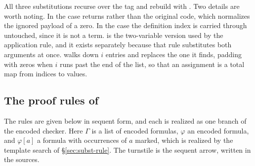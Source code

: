 \noindent
All three substitutions recurse over the tag and rebuild with .
Two details are worth noting.  In the  case  returns
 rather than the original code, which normalizes the
ignored payload of a zero.  In the  case the definition index
 is carried through untouched, since it is not a term.
 is the two-variable version used by the application rule, and
it exists separately because that rule substitutes both arguments at once.
 walks down $i$ entries and replaces the one it finds,
padding with zeros when $i$ runs past the end of the list, so that an
assignment is a total map from indices to values.

\subsection{The proof rules of \BGA}
\label{sec:rules}

The rules are given below in sequent form, and each is realized as one branch
of the encoded checker.  Here $\Gamma$ is a list of encoded formulas,
$\varphi$ an encoded formula, and $\varphi[a]$ a formula with occurrences of
$a$ marked, which is realized by the template search of
\S\ref{sec:subst-rule}.  The turnstile is the \BGA{} sequent arrow, written
 in the sources.

